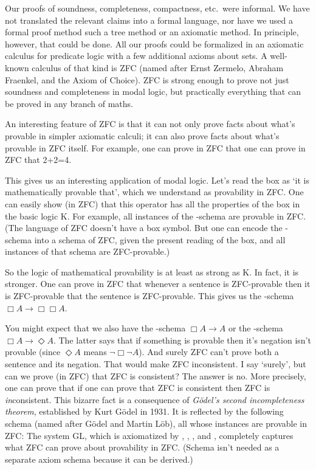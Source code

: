 Our proofs of soundness, completeness, compactness, etc.\ were informal. We have
not translated the relevant claims into a formal language, nor have we used a
formal proof method such a tree method or an axiomatic method. In principle,
however, that could be done. All our proofs could be formalized in an axiomatic
calculus for predicate logic with a few additional axioms about sets. A
well-known calculus of that kind is ZFC (named after Ernst Zermelo, Abraham
Fraenkel, and the Axiom of Choice). ZFC is strong enough to prove not just
soundness and completeness in modal logic, but practically everything that can
be proved in any branch of maths.

An interesting feature of ZFC is that it can not only prove facts about what's
provable in simpler axiomatic calculi; it can also prove facts about what's
provable in ZFC itself. For example, one can prove in ZFC that one can prove in
ZFC that 2+2=4.

This gives us  an interesting application of modal logic. Let's read the box as
`it is mathematically provable that', which we understand as provability in ZFC.
One can easily show (in ZFC) that this operator has all the properties of the
box in the basic logic K. For example, all instances of the -schema are
provable in ZFC. (The language of ZFC doesn't have a box symbol. But one can
encode the -schema into a schema of ZFC, given the present reading of the
box, and all instances of that schema are ZFC-provable.)

So the logic of mathematical provability is at least as strong as K. In fact, it
is stronger. One can prove in ZFC that whenever a sentence is ZFC-provable then
it is ZFC-provable that the sentence is ZFC-provable. This gives us the
-schema $\Box A \to \Box\Box A$.

You might expect that we also have the -schema $\Box A \to A$ or the
-schema $\Box A \to \Diamond A$. The latter says that if something is
provable then it's negation isn't provable (since $\Diamond A$ means
$\neg\Box\neg A$). And surely ZFC can't prove both a sentence and its negation.
That would make ZFC inconsistent. I say `surely', but can we prove (in ZFC) that
ZFC is consistent? The answer is no. More precisely, one can prove that if one
can prove that ZFC is consistent then ZFC is \emph{in}consistent. This bizarre
fact is a consequence of \emph{G\"odel's second incompleteness theorem},
established by Kurt G\"odel in 1931. It is reflected by the following schema
(named after G\"odel and Martin L\"ob), all whose instances are provable in ZFC:
%
%
The system GL, which is axiomatized by , , , and ,
completely captures what ZFC can prove about provability in ZFC. (Schema 
isn't needed as a separate axiom schema because it can be derived.)%

